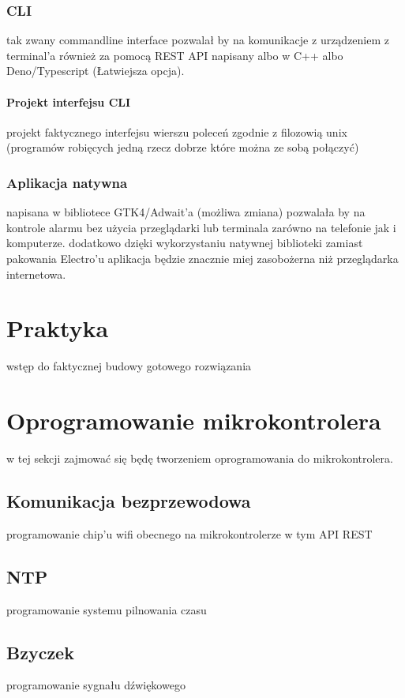 \documentclass[a4paper,12pt,oneside,onecolumn]{book}
\begin{document}
\subsection{CLI}
tak zwany commandline interface pozwalał by na komunikacje z urządzeniem z terminal'a również za pomocą REST API
\newline\newline
napisany albo w C++ albo Deno/Typescript (Łatwiejsza opcja).
\subsubsection{Projekt interfejsu CLI}
projekt faktycznego interfejsu wierszu poleceń zgodnie z filozowią unix (programów robięcych jedną rzecz dobrze które można ze sobą połączyć)
\subsection{Aplikacja natywna}
napisana w bibliotece GTK4/Adwait'a (możliwa zmiana) pozwalała by na kontrole alarmu bez użycia przeglądarki lub terminala zarówno na telefonie jak i komputerze.
\newline\newline
dodatkowo dzięki wykorzystaniu natywnej biblioteki zamiast pakowania Electro'u aplikacja będzie znacznie miej zasobożerna niż przeglądarka internetowa.
\chapter*{Praktyka}
wstęp do faktycznej budowy gotowego rozwiązania
\chapter{Oprogramowanie mikrokontrolera}
w tej sekcji zajmować się będę tworzeniem oprogramowania do mikrokontrolera.
\section{Komunikacja bezprzewodowa}
programowanie chip'u wifi obecnego na mikrokontrolerze
w tym API REST
\section{NTP}
programowanie systemu pilnowania czasu
\section{Bzyczek}
programowanie sygnału dźwiękowego
\end{document}
